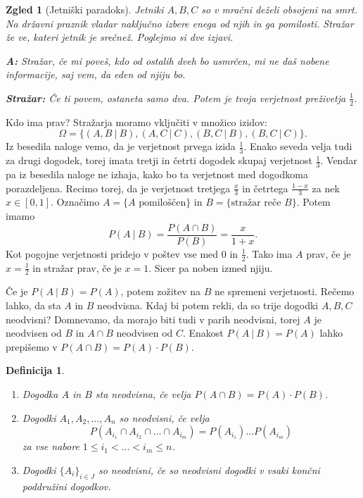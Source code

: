 \documentclass[10pt, a4paper]{article}
\newtheorem{defi}[izr]{Definicija}
\newenvironment{noticeB}{%
  \tcolorbox[%
  notitle,
  empty,
  enhanced,  %
  breakable,
  coltext=black,
  colback=white, 
  fontupper=\rmfamily,
  parbox=false,
  noparskip,
  sharp corners,
  boxrule=-1pt,  %
  frame hidden,
  left=7pt,  %
  right=7pt,
  top=5pt,
  bottom=5pt,
  before skip=2.5ex plus 2pt,
  after skip=2.5ex plus 2pt,
  borderline west = {1.5pt}{-0.1pt}{blue!30!black}, %
  overlay unbroken and last={%
    \draw[color=black, line width=1.25pt]
    ($(frame.south west)+(1.pt, -0.1pt)$) -- ++(2em, 0);
  }
  ]}
{\endtcolorbox}
\newenvironment{definicija}{\begin{defi}\begin{noticeB}}{%
    \end{noticeB}\end{defi}}
\newtheorem{zgled}[izr]{Zgled}
\begin{document}
\begin{zgled}[Jetniški paradoks]
  Jetniki $A, B, C$ so v mračni deželi obsojeni na smrt. Na državni praznik vladar naključno izbere enega od njih in ga pomilosti.
  Stražar že ve, kateri jetnik je srečnež. Poglejmo si dve izjavi.

  \textbf{A:} Stražar, če mi poveš, kdo od ostalih dveh bo usmrčen, mi ne daš nobene informacije, saj vem, da eden od njiju bo.

  \textbf{Stražar:} Če ti povem, ostaneta samo dva. Potem je tvoja verjetnost preživetja $\frac{1}{2}$.  
\end{zgled}
Kdo ima prav?
Stražarja moramo vključiti v množico izidov:
$$\Omega = \{(A, B\ |\ B), (A, C\ |\ C), (B, C\ |\ B), (B, C\ |\ C)\}.$$
Iz besedila naloge vemo, da je verjetnost prvega izida $\frac{1}{3}$.
Enako seveda velja tudi za drugi dogodek, torej imata tretji in četrti dogodek skupaj verjetnost $\frac{1}{3}$.
Vendar pa iz besedila naloge ne izhaja, kako bo ta verjetnost med dogodkoma porazdeljena.
Recimo torej, da je verjetnost tretjega $\frac{x}{3}$ in četrtega $\frac{1 - x}{3}$ za nek $x \in [0, 1]$.
Označimo $A = \{\text{$A$ pomiloščen}\}$ in $B = \{\text{stražar reče $B$}\}$. Potem imamo 
$$P(A\ |\ B) = \frac{P(A \cap B)}{P(B)} = \frac{x}{1 + x}.$$
Kot pogojne verjetnosti pridejo v poštev vse med $0$ in $\frac{1}{2}$.
Tako ima $A$ prav, če je $x = \frac{1}{2}$ in stražar prav, če je $x = 1$.
Sicer pa noben izmed njiju.

Če je $P(A\ |\ B) = P(A)$, potem zožitev na $B$ ne spremeni verjetnosti.
Rečemo lahko, da sta $A$ in $B$ neodvisna. Kdaj bi potem rekli, da so trije dogodki 
$A, B, C$ neodvisni? Domnevamo, da morajo biti tudi v parih neodvisni, torej $A$ je neodvisen od $B$ in 
$A \cap B$ neodvisen od $C$. Enakost $P(A\ |\ B) = P(A)$ lahko prepišemo v $P(A \cap B) = P(A) \cdot P(B)$.

\begin{definicija}
  \begin{enumerate}
    \item Dogodka $A$ in $B$ sta neodvisna, če velja $P(A \cap B) = P(A) \cdot P(B)$.
    \item Dogodki $A_1, A_2, \dots, A_n$ so neodvisni, če velja
    $$P(A_{i_1} \cap A_{i_2} \cap \dots \cap A_{i_m}) = P(A_{i_1}) \dots P(A_{i_m})$$
    za vse nabore $1 \leq i_1 < \dots < i_m \leq n$.
    \item Dogodki $\{A_i\}_{i \in J}$ so neodvisni, če so neodvisni dogodki v vsaki končni poddružini dogodkov.
  \end{enumerate}
\end{definicija}
\end{document}

